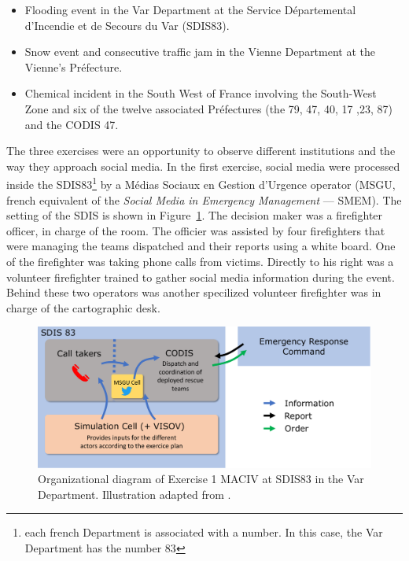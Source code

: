 \begin{itemize}
    \item Flooding event in the Var Department at the Service Départemental d’Incendie et de Secours du Var (SDIS83).
    \item Snow event and consecutive traffic jam in the Vienne Department at the Vienne's Préfecture.
    \item Chemical incident in the South West of France involving the South-West Zone and six of the twelve associated Préfectures (the 79, 47, 40, 17 ,23, 87) and the CODIS 47.
\end{itemize}

The three exercises were an opportunity to observe different institutions and the way they approach social media.
In the first exercise, social media were processed inside the SDIS83\footnote{each french Department is associated with a number. In this case, the Var Department has the number 83}
by a Médias Sociaux en Gestion d’Urgence operator (MSGU, french equivalent of the \textit{Social Media in Emergency Management} — SMEM).
The setting of the SDIS is shown in Figure~\ref{information:exercice-1-setup}.
The decision maker was a firefighter officer, in charge of the room.
The officier was assisted by four firefighters that were managing the teams dispatched and their reports using a white board.
One of the firefighter was taking phone calls from victims.
Directly to his right was a volunteer firefighter trained to gather social media information during the event.
Behind these two operators was another specilized volunteer firefighter was in charge of the cartographic desk.

\begin{figure}[htb]
    \centering
    \includegraphics[width=\textwidth]{figures/chap-3/exercice-1-setup.pdf}
    \caption{Organizational diagram of Exercise 1 MACIV at SDIS83 in the Var Department. Illustration adapted from \textcite{batardIntegrerContributionsCitoyennes2021}.}
    \label{information:exercice-1-setup}
\end{figure}

